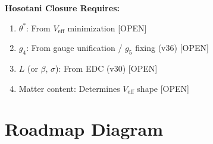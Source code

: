 \documentclass[11pt,a4paper]{article}
\newcommand{\tagOPEN}{\textcolor{red!70!black}{[OPEN]}}
\begin{document}
\begin{closurebox}
\textbf{Hosotani Closure Requires:}
\begin{enumerate}
    \item $\theta^*$: From $V_{\text{eff}}$ minimization \tagOPEN
    \item $g_4$: From gauge unification / $g_5$ fixing (v36) \tagOPEN
    \item $L$ (or $\beta$, $\sigma$): From EDC (v30) \tagOPEN
    \item Matter content: Determines $V_{\text{eff}}$ shape \tagOPEN
\end{enumerate}
\end{closurebox}

\section{Roadmap Diagram}
\end{document}
